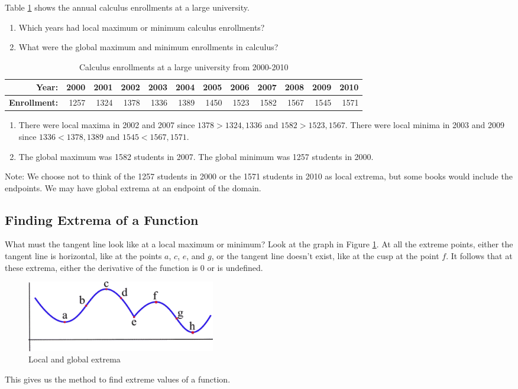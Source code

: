 \begin{example}
Table \ref{tab:3-4-enrollment} shows the annual calculus enrollments at a large university. 
    \begin{enumerate}[label=(\alph*)]
    \item Which years had local maximum or minimum calculus enrollments? 
    \item What were the global maximum and minimum enrollments in calculus?
    \end{enumerate}
\begin{table}[ht!]
\begin{centering}
\begin{tabular}{*{12}{r}}
\toprule
{\bf Year:}         & 2000	& 2001	& 2002	& 2003	& 2004	& 2005	& 2006	& 2007	& 2008	& 2009	& 2010\tabularnewline
\midrule
{\bf Enrollment:}   & 1257	& 1324	& 1378	& 1336	& 1389	& 1450	& 1523	& 1582	& 1567	& 1545	& 1571\tabularnewline
\bottomrule
\end{tabular}
\caption{Calculus enrollments at a large university from 2000-2010}
\label{tab:3-4-enrollment}
\end{centering}
\end{table}
			
\begin{solution} 
    \begin{enumerate}[label=(\alph*)]
    \item There were local maxima in 2002 and 2007 since $1378> 1324, 1336$ and $1582> 1523, 1567$. There were local minima in 2003 and 2009 since $1336<1378, 1389$ and $1545< 1567, 1571$.
    \item The global maximum was 1582 students in 2007. The global minimum was 1257 students in 2000. 
    \end{enumerate}
    Note: We choose not to think of the 1257 students in 2000 or the 1571 students in 2010 as local extrema, but some books would include the endpoints. We may have global extrema at an endpoint of the domain.
\end{solution}
\end{example}

\subsection{Finding Extrema of a Function}
What must the tangent line look like at a local maximum or minimum? Look at the graph in Figure \ref{fig:3-4-find}. At all the extreme points, either the tangent line is horizontal, like at the points $a$, $c$, $e$, and $g$, or the tangent line doesn't exist, like at the cusp at the point $f$. It follows that at these extrema, either the derivative of the function is $0$ or is undefined.
\begin{figure}[!ht]
  \centering
    \includegraphics[width=0.4\textwidth]{img/chap3/image047.png}
    \caption{Local and global extrema}
    \label{fig:3-4-find}
\end{figure}
This gives us the method to find extreme values of a function.

